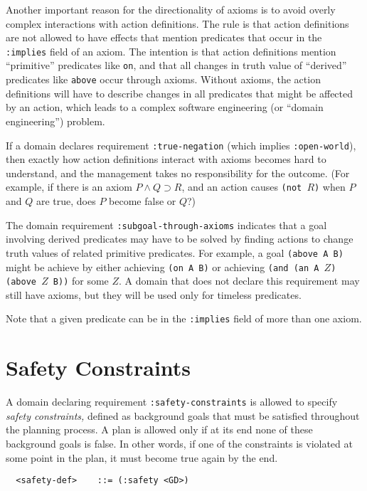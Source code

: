 Another important reason for the directionality of axioms is
to avoid overly complex interactions with
action definitions.  The rule is that action definitions are not allowed to
have effects that mention predicates that occur in the {\tt :implies} field
of an axiom.  The intention is that action definitions mention
``primitive'' predicates like {\tt on}, and that all changes in truth value
of ``derived'' predicates like {\tt above} occur through axioms.  Without
axioms, the action definitions will have to describe changes in all predicates
that might be affected by an action, which leads to a complex software engineering 
(or ``domain engineering'') problem.

If a domain declares requirement {\tt :true-negation} (which implies
{\tt :open-world}), then exactly how action definitions interact with
axioms becomes hard to understand, 
and the management takes no responsibility for the outcome.
(For example, if there is an axiom $P\wedge Q \supset R$, and an action
causes {\tt (not $R$)} when $P$ and $Q$ are true, does $P$ become
false or $Q$?)

The domain requirement {\tt :subgoal-through-axioms} indicates that a goal
involving derived predicates may have to be solved by finding actions to change
truth values of related primitive predicates.  For example, a goal 
{\tt (above A B)} might be achieve by either achieving {\tt (on A B)} or
achieving {\tt (and (an A $Z$) (above $Z$ B))} for some $Z$.
A domain that does not declare
this requirement may still have axioms, but they will be used only for timeless
predicates.

Note that a given predicate can be in the {\tt :implies} field of
more than one axiom.  

    \section{Safety Constraints}
\label{safety}

A domain declaring requirement {\tt :safety-constraints} is allowed to
specify {\em 
safety constraints,} defined as background goals that must be satisfied
throughout the planning process.  A plan is allowed only if at its end
none of these background goals is false.  In other words, if one of the
constraints is violated at some point in the plan, it must become true
again by the end.

\begin{verbatim}
  <safety-def>    ::= (:safety <GD>)
\end{verbatim}

